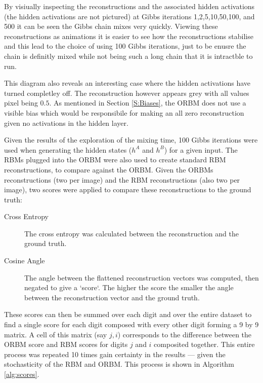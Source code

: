   By visiually inspecting the reconstructions and the associated hidden activations (the hidden activations are not pictured) at Gibbs iterations 1,2,5,10,50,100, and 500 it can be seen the Gibbs chain mixes very quickly. Viewing these reconstructions as animations it is easier to see how the reconstructions stabilise and this lead to the choice of using 100 Gibbs iterations, just to be enusre the chain is definitly mixed while not being such a long chain that it is intractble to run.

  This diagram also reveals an interesting case where the hidden activations have turned completley off. The reconstruction however appears grey with all values pixel being $0.5$. As mentioned in Section \ref{S:Biases}, the ORBM does not use a visible bias which would be responsibile for making an all zero reconstruction given no activations in the hidden layer.


  Given the results of the exploration of the mixing time, 100 Gibbs iterations were used when generating the hidden states ($h^A$ and $h^B$) for a given input. The RBMs plugged into the ORBM were also used to create standard RBM reconstructions, to compare against the ORBM. Given the ORBMs reconstructions (two per image) and the RBM reconstructions (also two per image), two scores were applied to compare these reconstructions to the ground truth:
  \begin{description}
    \item[Cross Entropy] The cross entropy was calculated between the reconstruction and the ground truth.
    \item[Cosine Angle] The angle between the flattened reconstruction vectors was computed, then negated to give a `score`. The higher the score the smaller the angle between the reconstruction vector and the ground truth.
  \end{description}
  These scores can then be summed over each digit and over the entire dataset to find a single score for each digit composed with every other digit forming a 9 by 9 matrix. A cell of this matrix (say $j,i$) corresponds to the difference between the ORBM score and RBM scores for digits $j$ and $i$ composited together. This entire process was repeated 10 times gain certainty in the results --- given the stochasticity of the RBM and ORBM. This process is shown in Algorithm \ref{alg:scores}.

